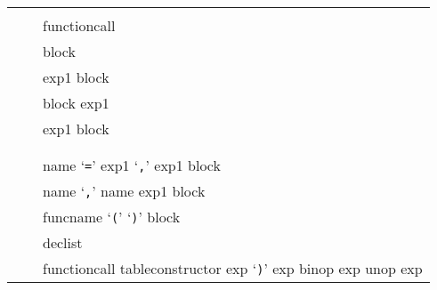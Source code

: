 \documentclass[11pt]{article}
\renewcommand{\ter}[1]{{\rm`{\tt#1}'}}
\begin{document}
\renewenvironment{Produc}{\vspace{0.8ex}\par\noindent\hspace{3ex}\it\begin{tabular}{rrl}}{\end{tabular}\vspace{0.8ex}\par\noindent}

\renewcommand{\OrNL}{\\ & \Or & }
\newcommand{\Nter}[1]{#1}




\begin{Produc}

\produc{chunk}{\rep{stat \opt{\ter{;}}}}

\produc{block}{chunk}

\produc{stat}{%
	varlist1 \ter{=} explist1
\OrNL	functioncall
\OrNL	\rwd{do} block \rwd{end}
\OrNL	\rwd{while} exp1 \rwd{do} block \rwd{end}
\OrNL	\rwd{repeat} block \rwd{until} exp1
\OrNL	\rwd{if} exp1 \rwd{then} block
	\rep{\rwd{elseif} exp1 \rwd{then} block}
	\opt{\rwd{else} block} \rwd{end}
\OrNL	\rwd{return} \opt{explist1}
\OrNL	\rwd{break}
\OrNL	\rwd{for} \Nter{name} \ter{=} exp1 \ter{,} exp1 \opt{\ter{,} exp1}
	\rwd{do} block \rwd{end}
\OrNL   \rwd{for} \Nter{name} \ter{,} \Nter{name} \rwd{in} exp1
                    \rwd{do} block \rwd{end}
\OrNL	\rwd{function} funcname \ter{(} \opt{parlist1} \ter{)} block \rwd{end}
\OrNL	\rwd{local} declist \opt{init}
}

\produc{funcname}{%
	\Nter{name}
\Or	\Nter{name} \ter{.} \Nter{name}
\Or	\Nter{name} \ter{:} \Nter{name}
}

\produc{varlist1}{var \rep{\ter{,} var}}

\produc{var}{%
	\Nter{name}
\Or	varorfunc \ter{[} exp1 \ter{]}
\Or	varorfunc \ter{.} \Nter{name}
}

\produc{varorfunc}{var \Or functioncall}

\produc{declist}{\Nter{name} \rep{\ter{,} \Nter{name}}}

\produc{init}{\ter{=} explist1}

\produc{explist1}{\rep{exp1 \ter{,}} exp}

\produc{exp1}{exp}

\produc{exp}{%
	\rwd{nil}
\Or	\Nter{number}
\Or	\Nter{literal}
\Or	var
\Or	function
\Or	upvalue
\OrNL	functioncall
\Or	tableconstructor
\Or	\ter{(} exp \ter{)}
\Or	exp binop exp
\Or	unop exp
}



\end{Produc}
\end{document}
